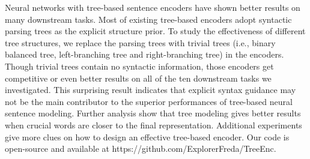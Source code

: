 Neural networks with tree-based sentence encoders have shown better results on many downstream tasks. Most of existing tree-based encoders adopt syntactic parsing trees as the explicit structure prior. To study the effectiveness of different tree structures, we replace the parsing trees with trivial trees (i.e., binary balanced tree, left-branching tree and right-branching tree) in the encoders. Though trivial trees contain no syntactic information, those encoders get competitive or even better results on all of the ten downstream tasks we investigated. This surprising result indicates that explicit syntax guidance may not be the main contributor to the superior performances of tree-based neural sentence modeling. Further analysis show that tree modeling gives better results when crucial words are closer to the final representation. Additional experiments give more clues on how to design an effective tree-based encoder. Our code is open-source and available at https://github.com/ExplorerFreda/TreeEnc.
